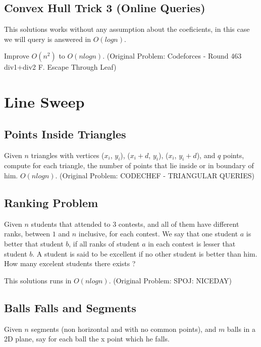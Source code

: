 \documentclass{report}
\begin{document}
        
        
        \subsection{Convex Hull Trick 3 (Online Queries)}
        This solutions works without any assumption about the coeficients, in this case we will query is answered in $O(logn)$.
        
        Improve $O(n^2)$ to $O(nlogn)$. (Original Problem: Codeforces - Round 463 div1+div2 F. Escape Through Leaf)
        
        
    \section{Line Sweep}
        \subsection{Points Inside Triangles}
        Given $n$ triangles with vertices {($x_i$, $y_i$), ($x_i + d$, $y_i$), ($x_i$, $y_i + d$)}, and $q$ points, compute for each triangle, the number of points that lie inside or in boundary of him. $O(nlogn)$. (Original Problem: CODECHEF - TRIANGULAR QUERIES)
        
        \subsection{Ranking Problem}
        Given $n$ students that attended to $3$ contests, and all of them have different ranks, between $1$ and $n$ inclusive, for each contest. We say that one student $a$ is better that student $b$, if all ranks of student $a$ in each contest is lesser that student $b$. A student is said to be excellent if no other student is better than him. How many excelent students there exists ?
        
        This solutions runs in $O(nlogn)$. (Original Problem: SPOJ: NICEDAY)
        
        
        
        \subsection{Balls Falls and Segments}
        Given $n$ segments (non horizontal and with no common points), and $m$ balls in a 2D plane, say for each ball the x point which he falls.
        
\end{document}
